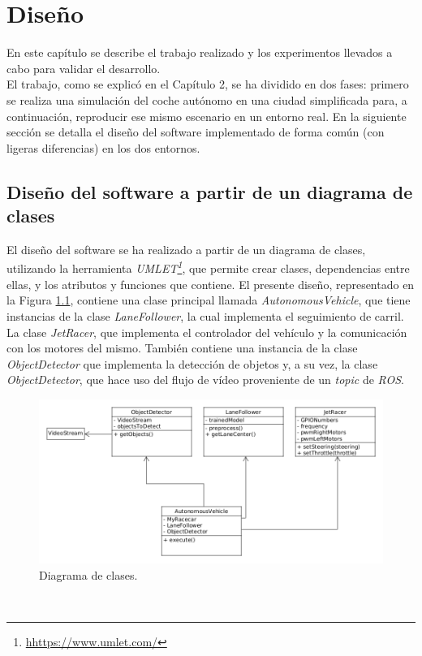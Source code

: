 \chapter{Diseño}
\label{cap:capitulo4}
En este capítulo se describe el trabajo realizado y los experimentos llevados a cabo para validar el desarrollo.\\

El trabajo, como se explicó en el Capítulo 2, se ha dividido en dos fases: primero se realiza una simulación del coche autónomo en una ciudad simplificada para, a continuación, reproducir ese mismo escenario en un entorno real. En la siguiente sección se detalla el diseño del software implementado de forma común (con ligeras diferencias) en los dos entornos.\\

\section{Diseño del software a partir de un diagrama de clases}
El diseño del software se ha realizado a partir de un diagrama de clases, utilizando la herramienta \textit{UMLET\footnote{\url{hhttps://www.umlet.com/}}}, que permite crear clases, dependencias entre ellas, y los atributos y funciones que contiene. El presente diseño, representado en la Figura \ref{fig:diagram}, contiene una clase principal llamada \textit{AutonomousVehicle}, que tiene instancias de la clase \textit{LaneFollower}, la cual implementa el seguimiento de carril. La clase \textit{JetRacer}, que implementa el controlador del vehículo y la comunicación con los motores del mismo. También contiene una instancia de la clase \textit{ObjectDetector} que implementa la detección de objetos y, a su vez, la clase \textit{ObjectDetector}, que hace uso del flujo de vídeo proveniente de un \textit{topic} de \textit{ROS}.
\begin{figure} [h!]
	\begin{center}
		\includegraphics[width=16cm]{figs/diagram5}
	\end{center}
	\caption{Diagrama de clases.}
	\label{fig:diagram}
\end{figure}\


